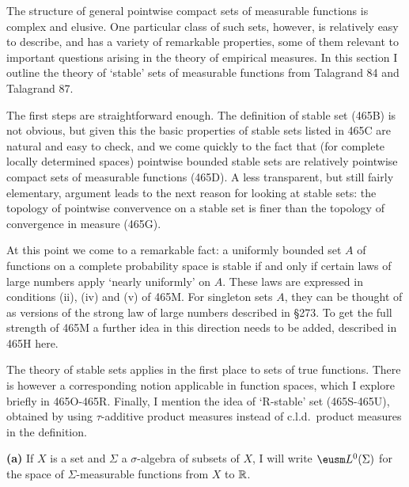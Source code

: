 
\def\chaptername{Pointwise compact sets of measurable functions}
\def\sectionname{Stable sets}


The structure of general pointwise compact sets of measurable functions
is complex and elusive.   One particular class of such sets, however, is
relatively easy to describe, and has a variety of remarkable properties,
some of them relevant to important questions arising in the theory of
empirical measures.   In this section I outline the theory of `stable'
sets of measurable functions from {\smc Talagrand 84} and 
{\smc Talagrand 87}.

The first steps are straightforward enough.   The definition of stable
set (465B) is not obvious, but given this the basic properties of stable
sets listed in 465C are natural and easy to check, and we come quickly
to the fact that (for complete locally determined spaces) pointwise
bounded stable sets are relatively pointwise compact sets of measurable
functions (465D).   A less transparent, but still fairly elementary,
argument leads to the next reason for looking at stable sets:  the
topology of pointwise convervence on a stable set is finer than the
topology of convergence in measure (465G).

At this point we come to a remarkable fact:  a uniformly bounded set $A$
of functions on a complete probability space is stable if and only if
certain laws of large numbers apply `nearly uniformly' on $A$.   These
laws are expressed in conditions (ii), (iv) and (v) of 465M.   For
singleton sets $A$, they can be thought of as versions of the strong
law of large numbers described in \S273.   To get the full strength of
465M a further idea in this direction needs to be added,
described in 465H here.

The theory of stable sets applies in the first place to sets of true
functions.   There is however a corresponding notion applicable in
function spaces, which I explore briefly in 465O-465R.   Finally, I
mention the idea of `R-stable' set (465S-465U), obtained by using
$\tau$-additive product measures instead of c.l.d.\ product measures in
the definition.

 {\bf (a)} If $X$ is a set and $\Sigma$ a $\sigma$-algebra of subsets of
$X$, I will write $\eusm L^0(\Sigma)$ for the space of
$\Sigma$-measurable functions from $X$ to $\Bbb R$.

